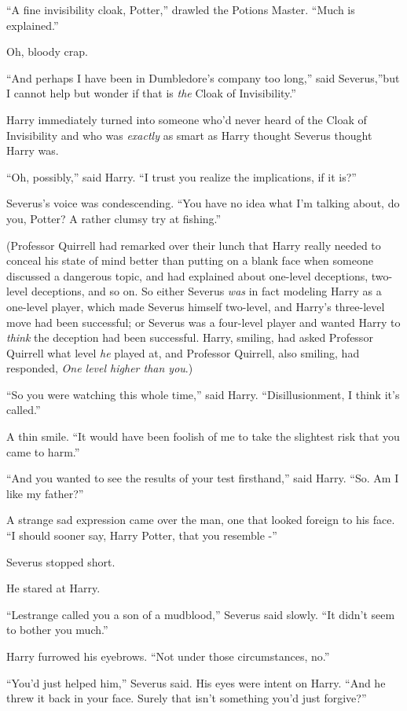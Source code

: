 ``A fine invisibility cloak, Potter,'' drawled the Potions Master.
``Much is explained.''

Oh, bloody crap.

``And perhaps I have been in Dumbledore's company too long,'' said
Severus,''but I cannot help but wonder if that is \emph{the} Cloak of
Invisibility.''

Harry immediately turned into someone who'd never heard of the Cloak of
Invisibility and who was \emph{exactly} as smart as Harry thought
Severus thought Harry was.

``Oh, possibly,'' said Harry. ``I trust you realize the implications, if
it is?''

Severus's voice was condescending. ``You have no idea what I'm talking
about, do you, Potter? A rather clumsy try at fishing.''

(Professor Quirrell had remarked over their lunch that Harry really
needed to conceal his state of mind better than putting on a blank face
when someone discussed a dangerous topic, and had explained about
one-level deceptions, two-level deceptions, and so on. So either Severus
\emph{was} in fact modeling Harry as a one-level player, which made
Severus himself two-level, and Harry's three-level move had been
successful; or Severus was a four-level player and wanted Harry to
\emph{think} the deception had been successful. Harry, smiling, had
asked Professor Quirrell what level \emph{he} played at, and Professor
Quirrell, also smiling, had responded, \emph{One level higher than
you}.)

``So you were watching this whole time,'' said Harry. ``Disillusionment,
I think it's called.''

A thin smile. ``It would have been foolish of me to take the slightest
risk that you came to harm.''

``And you wanted to see the results of your test firsthand,'' said
Harry. ``So. Am I like my father?''

A strange sad expression came over the man, one that looked foreign to
his face. ``I should sooner say, Harry Potter, that you resemble -''

Severus stopped short.

He stared at Harry.

``Lestrange called you a son of a mudblood,'' Severus said slowly. ``It
didn't seem to bother you much.''

Harry furrowed his eyebrows. ``Not under those circumstances, no.''

``You'd just helped him,'' Severus said. His eyes were intent on Harry.
``And he threw it back in your face. Surely that isn't something you'd
just forgive?''

